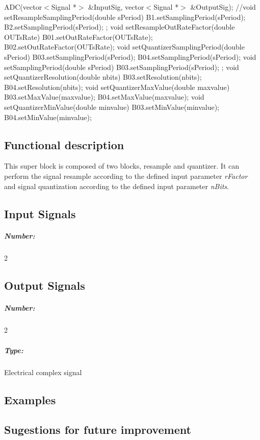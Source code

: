 ADC(vector$<$Signal *$>$ \&InputSig, vector$<$Signal *$>$ \&OutputSig);
\bigbreak
//void setResampleSamplingPeriod(double sPeriod) { B1.setSamplingPeriod(sPeriod); B2.setSamplingPeriod(sPeriod); };
\bigbreak
void setResampleOutRateFactor(double OUTsRate) { B01.setOutRateFactor(OUTsRate); B02.setOutRateFactor(OUTsRate); }
\bigbreak
void setQuantizerSamplingPeriod(double sPeriod) { B03.setSamplingPeriod(sPeriod); B04.setSamplingPeriod(sPeriod); }
\bigbreak
void setSamplingPeriod(double sPeriod) { B03.setSamplingPeriod(sPeriod); };
\bigbreak
void setQuantizerResolution(double nbits) { B03.setResolution(nbits); B04.setResolution(nbits); }
\bigbreak
void setQuantizerMaxValue(double maxvalue) { B03.setMaxValue(maxvalue); B04.setMaxValue(maxvalue);}
\bigbreak
void setQuantizerMinValue(double minvalue) { B03.setMinValue(minvalue); B04.setMinValue(minvalue); }

\subsection*{Functional description}

This super block is composed of two blocks, resample and quantizer. It can perform the signal resample according to the defined input parameter \textit{rFactor} and signal quantization according to the defined input parameter \textit{nBits}.


\pagebreak
\subsection*{Input Signals}

\subparagraph*{Number:} 2

\subsection*{Output Signals}

\subparagraph*{Number:} 2

\subparagraph*{Type:} Electrical complex signal

\subsection*{Examples}

\subsection*{Sugestions for future improvement}


